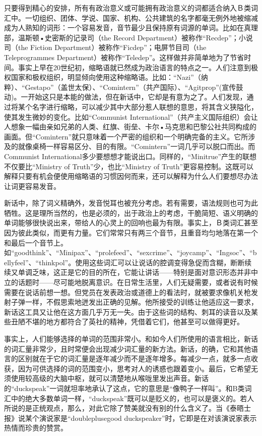 只要得到精心的安排，所有有政治意义或可能拥有政治意义的词都适合纳入Ｂ类词汇中。一切组织、团体、学说、国家、机构、公共建筑的名字都毫无例外地被缩减成为人熟知的词形：一个容易发音，音节最少且保持原有词源的单词。比如在真理部，温斯顿•史密斯的记录司（the
Record Department）被称作``Recdep''；小说司（the Fiction
Department）被称作``Ficdep''；电屏节目司（the Teleprogrammes
Department）被称作``Teledep''。这样做并非简单地为了节省时间。事实上早在20世纪初，缩略语就已然成为政治语言的特点之一。人们注意到极权国家和极权组织，明显倾向使用这种缩略语。比如：``Nazi''（纳粹）、``Gestapo''（盖世太保）、``Comintern''（共产国际）、``Agitprop''(宣传鼓动)。一开始这只是本能的做法，但在新话中，它却是有意为之了。人们发现，通过将某个名字进行缩略，可以减少其中大部分惹人联想的意思，将其含义狭隘化，使其发生微妙的变化。比如``Communist
International''（共产主义国际组织）会让人想象一幅由亲如兄弟的人类、红旗、街垒、卡尔•马克思和巴黎公社共同构成的画面。但``Comintern''就只意味着一个严密的组织和一个明确完备的主义。它所涉及的就像桌椅一样容易区分、目的有限。``Comintern''一词几乎可以脱口而出。而Communist
International多少要想想才能说出口。同样的，``Minitrue''产生的联想不仅要比``Ministry
of Truth''少，也比``Ministry of
Truth''更容易控制。这既可以解释只要有机会便使用缩略语的习惯因何而来，还可以解释为什么人们要想尽办法让词更容易发音。

新话中，除了词义精确外，发音悦耳也被充分考虑。若有需要，语法规则也可为此牺牲。这是理所当然的，也是必须的，出于政治上的考虑，干脆简短、语义明确的单词能够很快说出来，带给人的心灵上的回响也最为有限。事实上，Ｂ类词汇甚至因为彼此类似，而更有力量。它们常常只有两三个音节，且重音均匀地落在第一个和最后一个音节上。如``goodthink''、``Minipax''、``prolefeed''、``sexcrime''、``joycamp''、``Ingsoc''、``bellyfeel''、``thinkpol''。使用这些词汇可以让说话的腔调变得急促而含糊，断断续续又单调乏味，这正是它的目的所在，它能让讲话------特别是面对意识形态并非中立的话题时------尽可能地脱离意识。在日常生活里，人们无疑需要，或者说有时候需要在说话前想一想。但党员在发表政治或道德上的看法时，就被要求像机关枪发射子弹一样，不假思索地迸发出正确的见解。他所接受的训练让他适应这一要求，新话这工具又让他在这方面几乎万无一失。由于这些词的结构、刺耳的读音以及某些丑陋不堪的地方都符合了英社的精神，凭借着它们，他甚至可以做得更好。

事实上，人们能够选择的单词的范围非常小。和如今人们所使用的语言相比，新话的词汇量非常少，且时常便会出现减少词汇量的新方法。新话，的确，它和其他语言的区别就在于它的词汇量是逐年减少而不是逐年增多。每减少一点，就多一点收获，因为可供选择的词的范围变小，思考对人的诱惑也跟着变小。最后，它希望无须使用较高级的大脑中枢，就可以清楚地从喉咙里发出声音。新话的``duckspeak''一词就坦率地承认了这点，它的意思是``像鸭子一样叫''。和B类词汇中的绝大多数单词一样，``duckspeak''既可以是贬义的，也可以是褒义的。若人所说的是正统观点，那么，对此它除了赞美就没有别的什么含义了。当《泰晤士报》说某个演说家是``doubleplusegood
duckspeaker''时，它即是在对该演说家表示热情而珍贵的赞赏。

